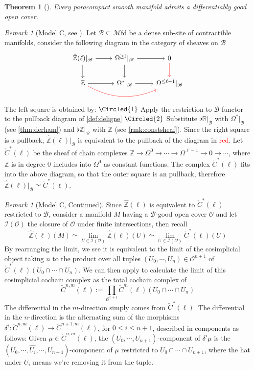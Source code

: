 \documentclass[10pt]{amsart}
\newcommand{\B}{\mathscr{B}}
\newcommand{\I}{\mathscr{I}}
\newcommand{\bR}{\mathbb{R}}
\newcommand{\bZ}{\mathbb{Z}}
\newcommand{\Mfd}{\mathscr{M}\mathrm{fd}}
\newtheorem{theorem}[equation]{Theorem}
\theoremstyle{definition}
\theoremstyle{remark}
\newtheorem{remark}[equation]{Remark}
\numberwithin{equation}{section}
\begin{document}
\begin{theorem}[{\cite[Theorem A.1]{fiorenza2011cechcocyclesdifferentialcharacteristic}}]
  Every paracompact smooth manifold admits a differentiably good open cover. 
\end{theorem}
\begin{remark}[Model C, see {\cite[Lemma 7.3.4]{amabeldebrayhaine2021diffcoh}}]\label{rmk:C} Let $\B\subseteq\Mfd$ be a dense sub-site of contractible manifolds, consider the following diagram in the category of {sheaves} on $\B$
  \[\begin{tikzcd}
     \hat{\bZ}(\ell)|_\B\arrow[d]\arrow[r] & \Omega^{\geq \ell}|_\B\arrow[d] \arrow[r] & 0\arrow[d,color=red] \\
    \bZ \arrow[r]\arrow[rr,bend right=2.5em,color=red] & \Omega^*|_\B\arrow[r] & \Omega^{\leq\ell-1}|_\B
  \end{tikzcd}\] The left square is obtained by: $\Circled{1}$ Apply the restriction to $\B$ functor to the pullback diagram of \cref{def:deligne} $\Circled{2}$ Substitute $\flat\bR|_\B$ with $\Omega^*|_\B$ (see \cref{thm:derham}) and $\flat\bZ|_\B$ with $\bZ$ (see \cref{rmk:constsheaf}). Since the right square is a pullback, $\hat{\bZ}(\ell)|_\B$ is equivalent to the pullback of the diagram in \textcolor{red}{red}. Let $\check{C}^*(\ell)$ be the sheaf of chain complexes $\bZ\to\Omega^0\to\cdots\to\Omega^{\ell-1}\to0\to\cdots$, where $\bZ$ is in degree 0 includes into $\Omega^0$ as constant functions. The complex $\check{C}^*(\ell)$ fits into the above diagram, so that the outer square is an pullback, therefore $\hat{\bZ}(\ell)|_\B\simeq\check{C}^*(\ell)$. 
\end{remark}
\begin{remark}[Model C, Continued]Since $\hat{\bZ}(\ell)$ is equivalent to $\check{C}^*(\ell)$ restricted to $\B$, consider a manifold $M$ having a $\B$-good open cover $\mathscr{O}$ and let $\I(\mathscr O)$ the closure of $\mathscr{O}$ under finite intersections, then recall
\[
    \hat{\bZ}(\ell)(M)\simeq\lim_{U\in\I(\mathscr{O})}\hat{\bZ}(\ell)(U)\simeq\lim_{U\in\I(\mathscr O)} \check{C}^*(\ell)(U)
  \]
  By rearranging the limit, we see it is equivalent to the limit of the cosimplicial object taking $n$ to the product over all tuples $(U_0,\cdots,U_n)\in\mathscr{O}^{n+1}$ of $\check C^*(\ell)(U_0\cap\cdots\cap U_n)$. We can then apply \cite[Lemma 7.10]{bunkenikolausvoelkl2016diffcoh} to calculate the limit of this cosimplicial cochain complex as the total cochain complex of \[\check{C}^{n,m}(\ell):=\prod_{\mathscr{O}^{n+1}}\check{C}^m(\ell)(U_0\cap\cdots\cap U_n)\]The differential in the $m$-direction simply comes from $\check C^*(\ell)$. The differential in the $n$-direction is the alternating sum of the morphisms $\delta^i:\check C^{n,m}(\ell)\to\check C^{n+1,m}(\ell)$, for $0\leq i\leq n+1$, described in components as follows: Given $\mu\in\check C^{n,m}(\ell)$, the $(U_0,\cdots,U_{n+1})$-component of $\delta^i\mu$ is the $(U_0,\cdots,\widehat{U_i},\cdots,U_{n+1})$-component of $\mu$ restricted to $U_0\cap\cdots\cap U_{n+1}$, where the hat under $U_i$ means we're removing it from the tuple. 
\end{remark}

{\footnotesize


}
\end{document}
